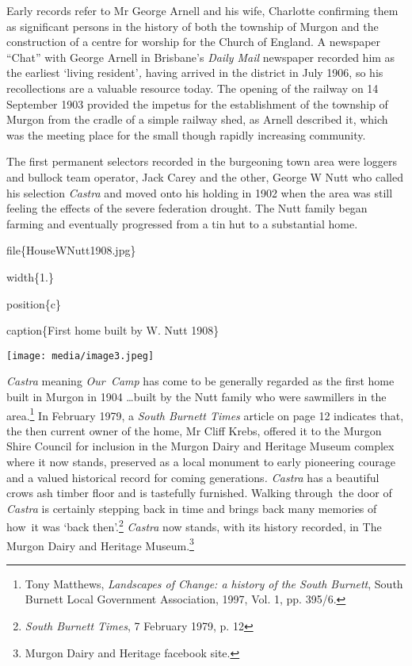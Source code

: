 Early records refer to Mr George Arnell and his wife, Charlotte confirming them as significant persons in the history of both the township of Murgon and the construction of a centre for worship for the Church of England. A newspaper ``Chat'' with George Arnell in Brisbane's \emph{Daily Mail} newspaper recorded him as the earliest `living resident'\emph{,} having arrived in the district in July 1906, so his recollections are a valuable resource today. The opening of the railway on 14 September 1903 provided the impetus for the establishment of the township of Murgon from the cradle of a simple railway shed, as Arnell described it, which was the meeting place for the small though rapidly increasing community.

The first permanent selectors recorded in the burgeoning town area were loggers and bullock team operator, Jack Carey and the other, George W Nutt who called his selection \emph{Castra} and moved onto his holding in 1902 when the area was still feeling the effects of the severe federation drought. The Nutt family began farming and eventually progressed from a tin hut to a substantial home.

file\{HouseWNutt1908.jpg\}

width\{1.\}

position\{c\}

caption\{First home built by W. Nutt 1908\}

\texttt{[image: media/image3.jpeg]}

\emph{Castra} meaning \emph{Our~Camp} has come to be generally regarded as the first home built in Murgon in 1904 \ldots built by the Nutt family who were sawmillers in the area.\footnote{Tony Matthews, \emph{Landscapes of Change: a history of the South Burnett}, South Burnett Local Government Association, 1997, Vol. 1, pp. 395/6.} In February 1979, a \emph{South Burnett Times} article on page 12 indicates that, the then current owner of the home, Mr Cliff Krebs, offered it to the Murgon Shire Council for inclusion in the Murgon Dairy and Heritage Museum complex where it now stands, preserved as a local monument to early pioneering courage and a valued historical record for coming generations\emph{. Castra} has a beautiful crows ash timber floor and is tastefully furnished. Walking through~the door of \emph{Castra} is certainly stepping back in time and brings back many memories of how~it was `back then'.\footnote{\emph{South Burnett Times}, 7 February 1979, p. 12} \emph{Castra} now stands, with its history recorded, in The Murgon Dairy and Heritage Museum.\footnote{Murgon Dairy and Heritage facebook site.}

